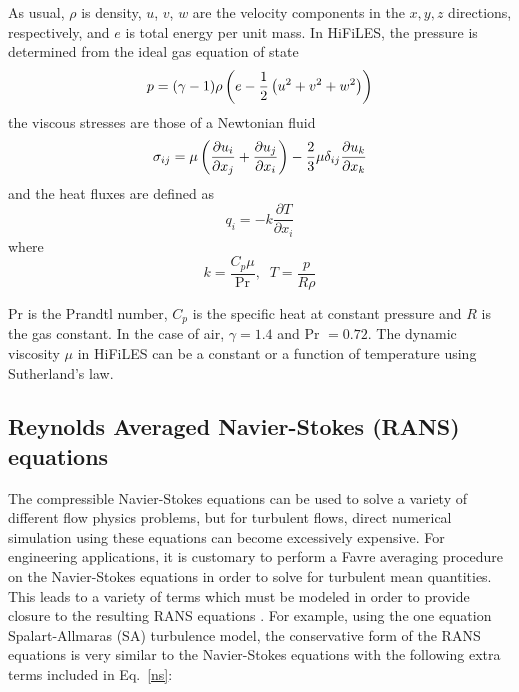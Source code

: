 As usual, $\rho$ is density, $u$, $v$, $w$ are the velocity components in the $x, y, z$ directions, respectively, and $e$ is total energy per unit mass. In HiFiLES, the pressure is determined from the ideal gas equation of state
\begin{equation}
p = (\gamma - 1)\rho\left(e - \frac{1}{2}\left(u^2 + v^2 + w^2\right)\right)
\end{equation}
the viscous stresses are those of a Newtonian fluid
\begin{equation}\label{sigma}
\sigma_{ij} = \mu\left( \frac{\partial u_i}{\partial x_j}
+ \frac{\partial u_j}{\partial x_i} \right)
- \frac{2}{3}\mu \delta_{ij}\frac{\partial u_k}{\partial x_k}
\end{equation}
and the heat fluxes are defined as
\begin{equation}
q_i = -k \frac{\partial T}{\partial x_i}
\end{equation}
where
\begin{equation}
k = \frac{C_p \mu}{\text{Pr}} , \;\; T = \frac{p}{R \rho}
\end{equation}

Pr is the Prandtl number, $C_p$ is the specific heat at constant pressure and $R$ is the gas constant. In the case of air, $\gamma = 1.4$ and Pr $= 0.72$. The dynamic viscosity $\mu$ in HiFiLES can be a constant or a function of temperature using Sutherland's law.

\subsection{Reynolds Averaged Navier-Stokes (RANS) equations}

The compressible Navier-Stokes equations can be used to solve a variety of different flow physics problems, but for turbulent flows, direct numerical simulation using these equations can become excessively expensive. For engineering applications, it is customary to perform a Favre averaging procedure on the Navier-Stokes equations in order to solve for turbulent mean quantities. 
This leads to a variety of terms which must be modeled in order to provide closure to the resulting RANS equations \cite{wilcox1998turbulence,oliver2008high}. For example, using the one equation Spalart-Allmaras (SA) turbulence model, the conservative form of the RANS equations is very similar to the Navier-Stokes equations with the following extra terms included in Eq.~\ref{ns}:


